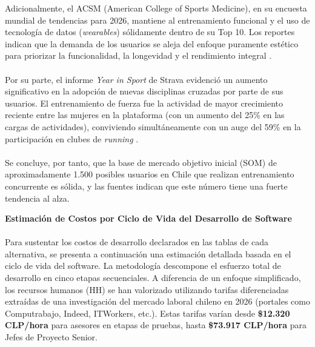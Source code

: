 \documentclass[12pt]{article}
\begin{document}
\vspace{0.3cm}
Adicionalmente, el ACSM (American College of Sports Medicine), en su encuesta mundial de tendencias para 2026, mantiene al entrenamiento funcional y el uso de tecnología de datos (\textit{wearables}) sólidamente dentro de su Top 10. Los reportes indican que la demanda de los usuarios se aleja del enfoque puramente estético para priorizar la funcionalidad, la longevidad y el rendimiento integral \citep{acsm_trends}.
\\\\
Por su parte, el informe \textit{Year in Sport} de Strava evidenció un aumento significativo en la adopción de nuevas disciplinas cruzadas por parte de sus usuarios. El entrenamiento de fuerza fue la actividad de mayor crecimiento reciente entre las mujeres en la plataforma (con un aumento del 25\% en las cargas de actividades), conviviendo simultáneamente con un auge del 59\% en la participación en clubes de \textit{running} \citep{strava_yis}.
\\\\
Se concluye, por tanto, que la base de mercado objetivo inicial (SOM) de aproximadamente 1.500 posibles usuarios en Chile que realizan entrenamiento concurrente es sólida, y las fuentes indican que este número tiene una fuerte tendencia al alza.

\newpage
\textbf{Estimación de Costos por Ciclo de Vida del Desarrollo de Software}
\\\\
Para sustentar los costos de desarrollo declarados en las tablas de cada alternativa, se presenta a continuación una estimación detallada basada en el ciclo de vida del software. La metodología descompone el esfuerzo total de desarrollo en cinco etapas secuenciales. A diferencia de un enfoque simplificado, los recursos humanos (HH) se han valorizado utilizando tarifas diferenciadas extraídas de una investigación del mercado laboral chileno en 2026 (portales como Computrabajo, Indeed, ITWorkers, etc.). Estas tarifas varían desde \textbf{\$12.320 CLP/hora} para asesores en etapas de pruebas, hasta \textbf{\$73.917 CLP/hora} para Jefes de Proyecto Senior.
\end{document}
